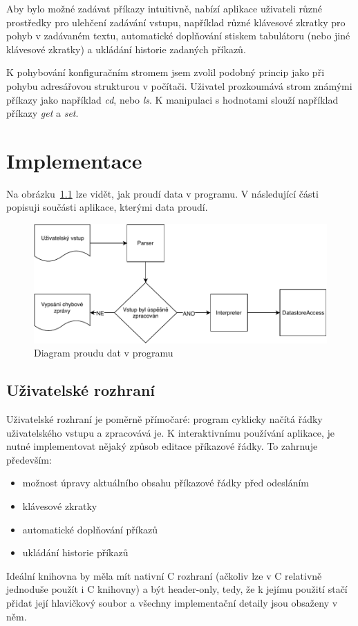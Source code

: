 \documentclass[thesis=B,czech,hidelinks]{FITthesis}[2019/03/06]
\newcommand{\Rplus}{\protect\hspace{-.1em}\protect\raisebox{.35ex}{\smaller{\smaller\textbf{+}}}}
\newcommand{\Cpp}{\mbox{C\Rplus\Rplus}\xspace}
\begin{document}
Aby bylo možné zadávat příkazy intuitivně, nabízí aplikace uživateli různé prostředky pro ulehčení zadávání vstupu, například různé klávesové zkratky pro pohyb v zadávaném textu, automatické doplňování stiskem tabulátoru (nebo jiné klávesové zkratky) a ukládání historie zadaných příkazů.


K pohybování konfiguračním stromem jsem zvolil podobný princip jako při pohybu adresářovou strukturou v počítači. Uživatel prozkoumává strom známými příkazy jako například \textit{cd}, nebo \textit{ls}. K manipulaci s hodnotami slouží například příkazy \textit{get} a \textit{set}.


\chapter{Implementace}
Na obrázku~\ref{proud-dat} lze vidět, jak proudí data v programu. V následující části popisuji součásti aplikace, kterými data proudí.
\begin{figure}
\begin{center}
\includegraphics[width=.9\textwidth]{diagram}
\end{center}
\caption{Diagram proudu dat v programu}\label{proud-dat}
\end{figure}

\section{Uživatelské rozhraní}
Uživatelské rozhraní je poměrně přímočaré: program cyklicky načítá řádky uživatelského vstupu a zpracovává je. K interaktivnímu používání aplikace, je nutné implementovat nějaký způsob editace příkazové řádky. To zahrnuje především:
\begin{itemize}
    \item možnost úpravy aktuálního obsahu příkazové řádky před odesláním
    \item klávesové zkratky
    \item automatické doplňování příkazů
    \item ukládání historie příkazů
\end{itemize}
Ideální knihovna by měla mít nativní \Cpp{} rozhraní (ačkoliv lze v \Cpp{} relativně jednoduše použít i C knihovny) a být header-only, tedy, že k jejímu použití stačí přidat její hlavičkový soubor a všechny implementační detaily jsou obsaženy v něm.
\end{document}

